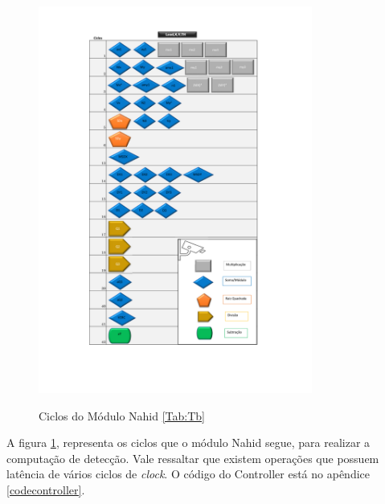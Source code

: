 \begin{figure}[H]
	\centering
	\includegraphics[width=9cm]{figures/TabelaCiclos.pdf}\\
	\caption{Ciclos do Módulo Nahid  \ref{Tab:Tb}}
	\label{ciclos}
\end{figure}

A figura \ref{ciclos}, representa os ciclos que o módulo Nahid segue, para realizar a computação de detecção. Vale ressaltar que existem operações que possuem latência de vários ciclos de \textit{clock}. O código do Controller está no apêndice \ref{codecontroller}.


